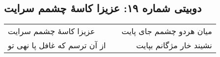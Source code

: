 \begin{center}
\section*{دوبیتی شماره ۱۹: عزیزا کاسهٔ چشمم سرایت}
\label{sec:019}
\begin{longtable}{l p{0.5cm} r}
عزیزا کاسهٔ چشمم سرایت
&&
میان هردو چشمم جای پایت
\\
از آن ترسم که غافل پا نهی تو
&&
نشیند خار مژگانم بپایت
\\
\end{longtable}
\end{center}
